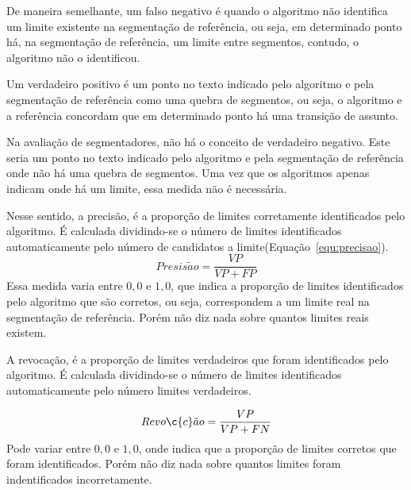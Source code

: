 %
De maneira semelhante, um falso negativo é quando o algoritmo não identifica um limite existente na segmentação de referência, ou seja, em determinado ponto há, na segmentação de referência, um limite entre segmentos, contudo, o algoritmo não o identificou.

%
Um verdadeiro positivo é um ponto no texto indicado pelo algoritmo e pela segmentação de referência como uma quebra de segmentos, ou seja, o algoritmo e a referência concordam que em determinado ponto há uma transição de assunto.

%
Na avaliação de segmentadores, não há o conceito de verdadeiro negativo. Este seria um ponto no texto indicado pelo algoritmo e pela segmentação de referência onde não há uma quebra de segmentos. Uma vez que os algoritmos apenas indicam onde há um limite, essa medida não é necessária. %



Nesse sentido, 
%
a precisão, é a proporção de limites corretamente identificados pelo algoritmo. 
%
É calculada dividindo-se o número de limites identificados automaticamente pelo número de candidatos a limite(Equação~\ref{equ:precisao}).
% 
\begin{equation}
	Presis\tilde{a}o = \frac{VP}{VP+FP}
	\label{equ:precisao}
\end{equation}
%
Essa medida varia entre $0,0$ e $1,0$, que indica a proporção de limites identificados pelo algoritmo que são corretos, ou seja, correspondem a um limite real na segmentação de referência. Porém não diz nada sobre quantos limites reais existem. 



%
A revocação, é a proporção de limites verdadeiros que foram identificados pelo algoritmo.
%
É calculada dividindo-se o número de limites identificados automaticamente pelo número limites verdadeiros.


% 
\begin{equation}
	Revo\c{c}\tilde{a}o = \frac{VP}{VP+FN}
	\label{equ:revocacao}
\end{equation}
%
Pode variar entre $0,0$ e $1,0$, onde indica que a proporção de limites corretos que foram identificados. Porém não diz nada sobre quantos limites foram indentificados incorretamente. 

